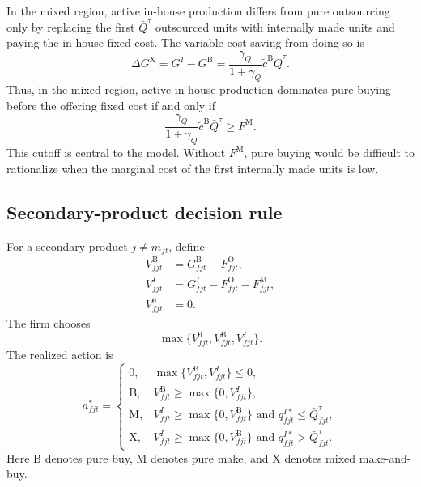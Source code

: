 \documentclass[11pt,a4paper]{article}
\newcommand{\M}{\mathrm{M}}
\newcommand{\B}{\mathrm{B}}
\newcommand{\X}{\mathrm{X}}
\newcommand{\OFC}{\mathrm{O}}
\begin{document}
In the mixed region, active in-house production differs from pure outsourcing only by replacing the first $\bar Q^{\tau}$ outsourced units with internally made units and paying the in-house fixed cost. The variable-cost saving from doing so is
\begin{equation}
    \Delta G^{\X}
    =G^{I}-G^{\B}
    =\frac{\gamma_Q}{1+\gamma_Q}\widetilde c^{\B}\bar Q^{\tau}.
    \label{eq:mix_saving}
\end{equation}
Thus, in the mixed region, active in-house production dominates pure buying before the offering fixed cost if and only if
\begin{equation}
    \frac{\gamma_Q}{1+\gamma_Q}\widetilde c^{\B}\bar Q^{\tau}\geq F^{\M}.
    \label{eq:mix_buy_cutoff}
\end{equation}
This cutoff is central to the model. Without $F^{\M}$, pure buying would be difficult to rationalize when the marginal cost of the first internally made units is low.

\subsection{Secondary-product decision rule}

For a secondary product $j\neq m_{ft}$, define
\begin{align}
    V^{\B}_{fjt}&=G^{\B}_{fjt}-F^{\OFC}_{fjt},
    \label{eq:VB}\\
    V^{I}_{fjt}&=G^{I}_{fjt}-F^{\OFC}_{fjt}-F^{\M}_{fjt},
    \label{eq:VI}\\
    V^0_{fjt}&=0.
\end{align}
The firm chooses
\begin{equation}
    \max\{V^0_{fjt},V^{\B}_{fjt},V^{I}_{fjt}\}.
    \label{eq:secondary_max}
\end{equation}
The realized action is
\begin{equation}
    a^*_{fjt}= 
    \begin{cases}
        0, & \max\{V^{\B}_{fjt},V^{I}_{fjt}\}\leq0,\\
        \B, & V^{\B}_{fjt}\geq\max\{0,V^{I}_{fjt}\},\\
        \M, & V^{I}_{fjt}\geq\max\{0,V^{\B}_{fjt}\}\text{ and }q^{I*}_{fjt}\leq\bar Q^{\tau}_{fjt},\\
        \X, & V^{I}_{fjt}\geq\max\{0,V^{\B}_{fjt}\}\text{ and }q^{I*}_{fjt}>\bar Q^{\tau}_{fjt}.
    \end{cases}
    \label{eq:action_rule}
\end{equation}
Here $\B$ denotes pure buy, $\M$ denotes pure make, and $\X$ denotes mixed make-and-buy.
\end{document}

